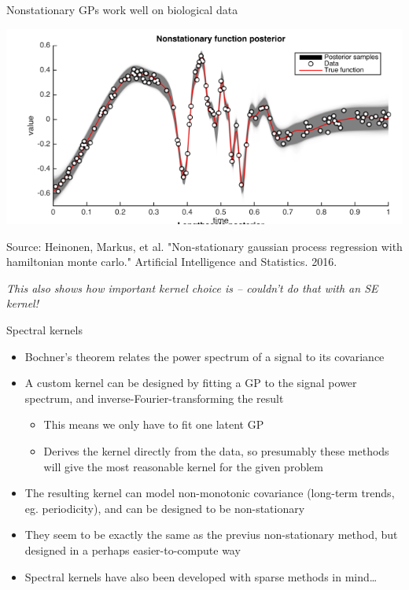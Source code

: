 \documentclass[presentation]{beamer}
\begin{document}
\begin{frame}[plain,label={sec:orgb9551cd}]{Nonstationary GPs work well on biological data}
\begin{center}
\includegraphics[width=.9\linewidth]{./nonstationary.png}
\end{center}

Source: Heinonen, Markus, et al. "Non-stationary gaussian process regression with hamiltonian monte carlo." Artificial Intelligence and Statistics. 2016.

\vfill

\emph{This also shows how important kernel choice is -- couldn't do that with an SE kernel!}
\end{frame}

\begin{frame}[label={sec:orgf51b477}]{Spectral kernels}
\begin{itemize}
\item Bochner's theorem relates the power spectrum of a signal to its covariance
\item A custom kernel can be designed by fitting a GP to the signal power spectrum, and inverse-Fourier-transforming the result
\begin{itemize}
\item This means we only have to fit one latent GP
\item Derives the kernel directly from the data, so presumably these methods will give the most reasonable kernel for the given problem
\end{itemize}
\item The resulting kernel can model non-monotonic covariance (long-term trends, eg. periodicity), and can be designed to be non-stationary
\item They seem to be exactly the same as the previus non-stationary method, but designed in a perhaps easier-to-compute way
\end{itemize}

\vfill

\begin{itemize}
\item Spectral kernels have also been developed with sparse methods in mind\ldots{}
\end{itemize}
\end{frame}
\end{document}
